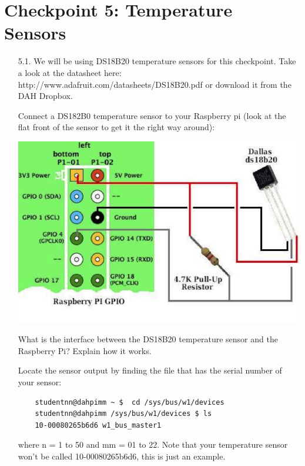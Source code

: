 \newpage
\section{Checkpoint 5: Temperature Sensors}

\begin{enumerate}

\item [5.1.] We will be using DS18B20 temperature sensors for this checkpoint. Take a look at the datasheet here: http://www.adafruit.com/datasheets/DS18B20.pdf  or download it from the DAH Dropbox.

Connect a DS182B0 temperature sensor to your Raspberry pi (look at the flat front of the sensor to get it the right way around):
\begin{center}
    \includegraphics[width=14cm]{figs/DS182B0}
\end{center}

What is the interface between the DS18B20 temperature sensor and the Raspberry Pi? Explain how it works. 

Locate the sensor output by finding the file that has the serial number of your sensor:
\begin{verbatim} 
    studentnn@dahpimm ~ $  cd /sys/bus/w1/devices 
    studentnn@dahpimm /sys/bus/w1/devices $ ls 
    10-00080265b6d6 w1_bus_master1 
\end{verbatim}
where n = 1 to 50 and mm = 01 to 22.
Note that your temperature sensor won't be called 10-00080265b6d6, this is just an example.


\end{enumerate}
